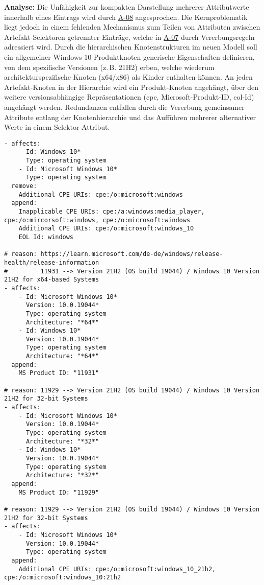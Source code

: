 \textbf{Analyse:}
Die Unfähigkeit zur kompakten Darstellung mehrerer Attributwerte innerhalb eines Eintrags wird durch \hyperref[subsec:req-multiple-attribute-values]{A-08} angesprochen.
Die Kernproblematik liegt jedoch in einem fehlenden Mechanismus zum Teilen von Attributen zwischen Artefakt-Selektoren getrennter Einträge, welche in \hyperref[subsec:req-selektor-inheritance]{A-07} durch Vererbungsregeln adressiert wird.
Durch die hierarchischen Knotenstrukturen im neuen Modell soll ein allgemeiner Windows-10-Produktknoten generische Eigenschaften definieren, von dem spezifische Versionen (z.\,B. 21H2) erben, welche wiederum architekturspezifische Knoten (x64/x86) als Kinder enthalten können.
An jeden Artefakt-Knoten in der Hierarchie wird ein Produkt-Knoten angehängt, über den weitere versionsabhängige Repräsentationen (\acrshort{cpe}, Microsoft-Produkt-ID, \acrshort{eol}-Id) angehängt werden.
Redundanzen entfallen durch die Vererbung gemeinsamer Attribute entlang der Knotenhierarchie und das Aufführen mehrerer alternativer Werte in einem Selektor-Attribut.

\begin{lstlisting}[style=yaml,caption={Windows-Korrelation mit mehreren Identifikatoren},label={lst:reference-case-windows},basicstyle=\ttfamily\scriptsize]
- affects:
    - Id: Windows 10*
      Type: operating system
    - Id: Microsoft Windows 10*
      Type: operating system
  remove:
    Additional CPE URIs: cpe:/o:microsoft:windows
  append:
    Inapplicable CPE URIs: cpe:/a:windows:media_player, cpe:/o:mircorsoft:windows, cpe:/o:microsoft:windows
    Additional CPE URIs: cpe:/o:microsoft:windows_10
    EOL Id: windows

# reason: https://learn.microsoft.com/de-de/windows/release-health/release-information
#         11931 --> Version 21H2 (OS build 19044) / Windows 10 Version 21H2 for x64-based Systems
- affects:
    - Id: Microsoft Windows 10*
      Version: 10.0.19044*
      Type: operating system
      Architecture: "*64*"
    - Id: Windows 10*
      Version: 10.0.19044*
      Type: operating system
      Architecture: "*64*"
  append:
    MS Product ID: "11931"

# reason: 11929 --> Version 21H2 (OS build 19044) / Windows 10 Version 21H2 for 32-bit Systems
- affects:
    - Id: Microsoft Windows 10*
      Version: 10.0.19044*
      Type: operating system
      Architecture: "*32*"
    - Id: Windows 10*
      Version: 10.0.19044*
      Type: operating system
      Architecture: "*32*"
  append:
    MS Product ID: "11929"

# reason: 11929 --> Version 21H2 (OS build 19044) / Windows 10 Version 21H2 for 32-bit Systems
- affects:
    - Id: Microsoft Windows 10*
      Version: 10.0.19044*
      Type: operating system
  append:
    Additional CPE URIs: cpe:/o:microsoft:windows_10_21h2, cpe:/o:microsoft:windows_10:21h2
\end{lstlisting}
